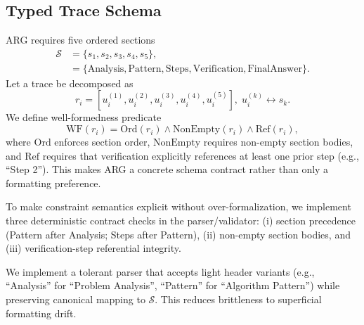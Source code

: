 \documentclass{article}
\begin{document}
\subsection{Typed Trace Schema}
ARG requires five ordered sections
\begin{equation}
\label{eq:section-schema}
\begin{aligned}
\mathcal{S}&=\{s_1,s_2,s_3,s_4,s_5\},\\
&=\{\text{Analysis},\text{Pattern},\text{Steps},\text{Verification},\text{FinalAnswer}\}.
\end{aligned}
\end{equation}
Let a trace be decomposed as
\begin{equation}
\label{eq:trace-decomposition}
r_i = [u_i^{(1)},u_i^{(2)},u_i^{(3)},u_i^{(4)},u_i^{(5)}],\; u_i^{(k)}\leftrightarrow s_k.
\end{equation}
We define well-formedness predicate
\begin{equation}
\label{eq:wf}
\mathrm{WF}(r_i)=\mathrm{Ord}(r_i)\land\mathrm{NonEmpty}(r_i)\land\mathrm{Ref}(r_i),
\end{equation}
where \(\mathrm{Ord}\) enforces section order, \(\mathrm{NonEmpty}\) requires non-empty section bodies, and \(\mathrm{Ref}\) requires that verification explicitly references at least one prior step (e.g., ``Step 2''). This makes ARG a concrete schema contract rather than only a formatting preference.

To make constraint semantics explicit without over-formalization, we implement three deterministic contract checks in the parser/validator: (i) section precedence (Pattern after Analysis; Steps after Pattern), (ii) non-empty section bodies, and (iii) verification-step referential integrity.

We implement a tolerant parser that accepts light header variants (e.g., ``Analysis'' for ``Problem Analysis'', ``Pattern'' for ``Algorithm Pattern'') while preserving canonical mapping to \(\mathcal{S}\). This reduces brittleness to superficial formatting drift.
\end{document}
